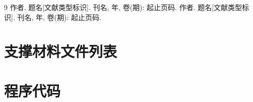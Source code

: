 \documentclass[withoutpreface,bwprint]{cumcmthesis}
\begin{document}
\begin{thebibliography}{9}
   作者. 题名[文献类型标识]. 刊名, 年, 卷(期): 起止页码.
   作者. 题名[文献类型标识]. 刊名, 年, 卷(期): 起止页码.
\end{thebibliography}

\begin{appendices}
  \section{支撑材料文件列表}

  \section{程序代码}
\end{appendices}

%
%
\end{document}
